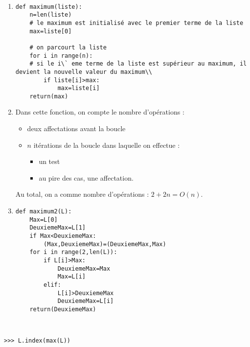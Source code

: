 \begin{solution}~\\
\vspace{-0.7cm}
\begin{enumerate}
\item 
\begin{verbatim}
def maximum(liste):
    n=len(liste)
    # le maximum est initialisé avec le premier terme de la liste
    max=liste[0]
    
    # on parcourt la liste
    for i in range(n):
    # si le i\` eme terme de la liste est supérieur au maximum, il devient la nouvelle valeur du maximum\\
        if liste[i]>max:
            max=liste[i]
    return(max)                    
\end{verbatim}


\item Dans cette fonction, on compte le nombre d'opérations :
\begin{itemize}
\item deux affectations avant la boucle
\item $n$ itérations de la boucle dans laquelle on effectue :
\begin{itemize}
\item un test
\item au pire des cas, une affectation.
\end{itemize}
\end{itemize}
Au total, on a comme nombre d'opérations : $2+2n=O(n)$.
\item 
\begin{verbatim}
def maximum2(L):
    Max=L[0]
    DeuxiemeMax=L[1]
    if Max<DeuxiemeMax:
        (Max,DeuxiemeMax)=(DeuxiemeMax,Max)
    for i in range(2,len(L)):
        if L[i]>Max:
            DeuxiemeMax=Max
            Max=L[i]
        elif:
            L[i]>DeuxiemeMax
            DeuxiemeMax=L[i]
    return(DeuxiemeMax)            
\end{verbatim}
\end{enumerate}
\end{solution}



\begin{solution}~\\
\vspace{-0.7cm}
\begin{verbatim}
>>> L.index(max(L))
\end{verbatim}
\end{solution}




